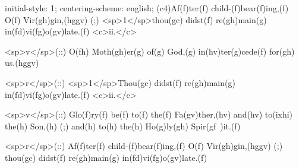 initial-style: 1;
centering-scheme: english;
(c4)Af(f)ter(f) child-(f)bear(f)ing,(f) O(f) Vir(gh)gin,(hggv) (;) <sp>1</sp>thou(gc) didst(f) re(gh)main(g) in(fd)vi(fg)o(gv)late.(f) <c>ii.</c>

<sp>v</sp>(::) O(fh) Moth(gh)er(g) of(g) God,(g) in(hv)ter(g)cede(f) for(gh) us.(hggv)

<sp>r</sp>(::) <sp>1</sp>Thou(gc) didst(f) re(gh)main(g) in(fd)vi(fg)o(gv)late.(f) <c>ii.</c>

<sp>v</sp>(::) Glo(f)ry(f) be(f) to(f) the(f) Fa(gv)ther,(hv) and(hv) to(ixhi) the(h) Son,(h) (;) and(h) to(h) the(h) Ho(g)ly(gh) Spir(gf~)it.(f)

<sp>r</sp>(::) Af(f)ter(f) child-(f)bear(f)ing,(f) O(f) Vir(gh)gin,(hggv) (;) thou(gc) didst(f) re(gh)main(g) in(fd)vi(fg)o(gv)late.(f)
